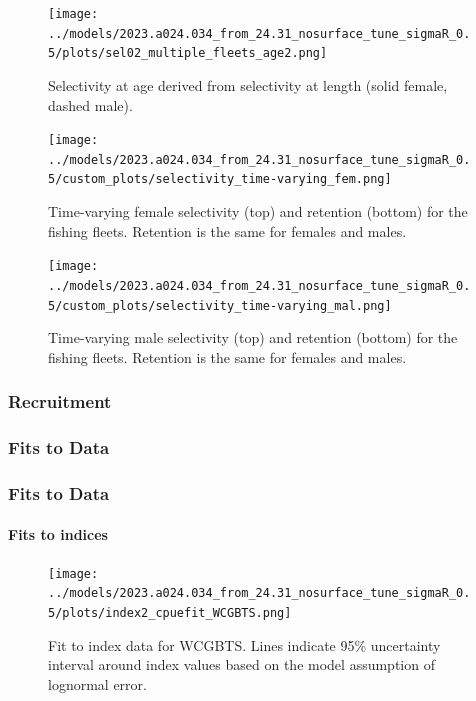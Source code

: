 \documentclass[11pt,
  english,
  letterpaper,
]{article}
\begin{document}
\begin{figure}
\centering
\texttt{[image: ../models/2023.a024.034\_from\_24.31\_nosurface\_tune\_sigmaR\_0.5/plots/sel02\_multiple\_fleets\_age2.png]}
\caption{Selectivity at age derived from selectivity at length (solid female, dashed male).\label{fig:sel-length}}
\end{figure}

\begin{figure}
\centering
\texttt{[image: ../models/2023.a024.034\_from\_24.31\_nosurface\_tune\_sigmaR\_0.5/custom\_plots/selectivity\_time-varying\_fem.png]}
\caption{Time-varying female selectivity (top) and retention (bottom) for the fishing fleets. Retention is the same for females and males.\label{fig:sel-tv-fem}}
\end{figure}

\begin{figure}
\centering
\texttt{[image: ../models/2023.a024.034\_from\_24.31\_nosurface\_tune\_sigmaR\_0.5/custom\_plots/selectivity\_time-varying\_mal.png]}
\caption{Time-varying male selectivity (top) and retention (bottom) for the fishing fleets. Retention is the same for females and males.\label{fig:sel-tv-mal}}
\end{figure}

\hypertarget{recruitment-1}{%
\subsubsection{Recruitment}\label{recruitment-1}}

\hypertarget{fits-to-data}{%
\subsubsection{Fits to Data}\label{fits-to-data}}

\hypertarget{fits-to-data-1}{%
\subsubsection{Fits to Data}\label{fits-to-data-1}}

\hypertarget{fits-to-indices}{%
\paragraph{Fits to indices}\label{fits-to-indices}}

\begin{figure}
\centering
\texttt{[image: ../models/2023.a024.034\_from\_24.31\_nosurface\_tune\_sigmaR\_0.5/plots/index2\_cpuefit\_WCGBTS.png]}
\caption{Fit to index data for WCGBTS. Lines indicate 95\% uncertainty interval around index values based on the model assumption of lognormal error.\label{fig:index-wcgbts-fit}}
\end{figure}
\end{document}
